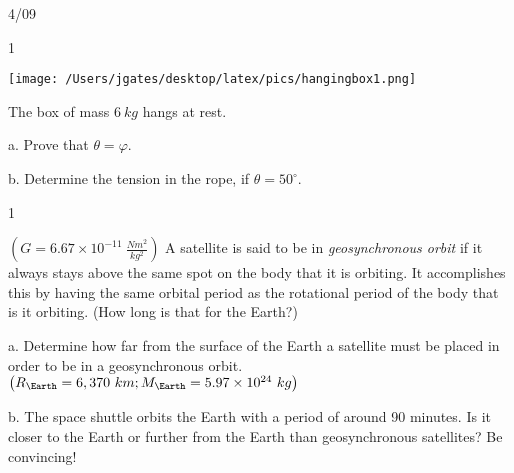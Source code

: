 


\hfill {\large 4/09}
\bigskip


\AddToShipoutPicture*{\BackgroundPic}

\addtocounter {ProbNum} {1}

\begin{floatingfigure}[r]{.2\textwidth}
\texttt{[image: /Users/jgates/desktop/latex/pics/hangingbox1.png]}
\end{floatingfigure}
 
{\bf \Large{}} The box of mass ${6~kg}$ hangs at rest. 

\bigskip

\indent  a. Prove that ${\theta = \varphi}$.

\vfill

b. Determine the tension in the rope, if ${\theta = 50^\circ}$.

\vfill

\newpage


\AddToShipoutPicture*{\BackgroundPic}

\addtocounter {ProbNum} {1}

{\bf \Large{}} ${\left ( G = 6.67 \times 10^{-11}~\tfrac{Nm^2}{kg^2} \right )}$ A satellite is said to be in \emph{geosynchronous orbit} if it always stays above the same spot on the body that it is orbiting.  It accomplishes this by having the same orbital period as the rotational period of the body that is it orbiting. (How long is that for the Earth?)

\bigskip

a. Determine how far from the surface of the Earth a satellite must be placed in order to be in a geosynchronous orbit. ${\left ( R_{\Earth} = 6,370~km; M_{\Earth}=5.97 \times 10^{24}~kg \right )}$

\vfill

b. The space shuttle orbits the Earth with a period of around 90 minutes.  Is it closer to the Earth or further from the Earth than geosynchronous satellites?  Be convincing!

